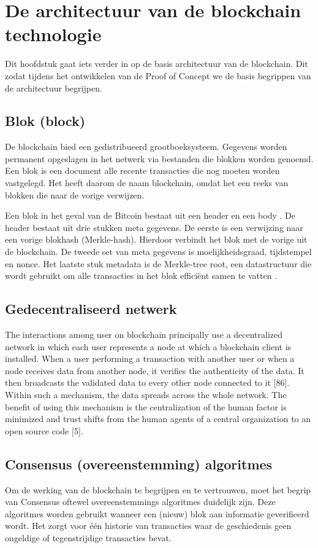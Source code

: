 \chapter{De architectuur van de blockchain technologie}
Dit hoofdstuk gaat iets verder in op de basis architectuur van de blockchain. Dit zodat tijdens het ontwikkelen van de Proof of Concept we de basis begrippen van de architectuur begrijpen.

\section{Blok (block)}
De blockchain bied een gedistribueerd grootboeksysteem. Gegevens worden permanent opgeslagen in het netwerk via bestanden die blokken worden genoemd. Een blok is een document alle recente transacties die nog moeten worden vastgelegd. Het heeft daarom de naam blockchain, omdat het een reeks van blokken die naar de vorige verwijzen\cite{blochchainTechSymmbioticDev}.\par

Een blok in het geval van de Bitcoin bestaat uit een header en een body \cite{blockchainIssuesAndChallenges}. De header bestaat uit drie stukken meta gegevens. De eerste is een verwijzing naar een vorige blokhash (Merkle-hash). Hierdoor verbindt het blok met de vorige uit de blockchain. De tweede set van meta gegevens is  moelijkheidsgraad, tijdstempel en nonce. Het laatste stuk metadata is de Merkle-tree root, een datastructuur die wordt gebruikt om alle transacties in het blok efficiënt samen te vatten \cite{masteringBitcoin}.

\section{Gedecentraliseerd netwerk}
The interactions among user on blockchain principally use a decentralized network in which each user represents a node at which a blockchain client is installed. When a user performing a transaction with another user or when a node receives data from another node, it verifies the authenticity of the data. It then broadcasts the validated data to every other node connected to it [86]. Within such a mechanism, the data spreads across the whole network. The benefit of using this mechanism is the centralization of the human factor is minimized and trust shifts from the human agents of a central organization to an open source code [5].
\newpage

\section{Consensus (overeenstemming) algoritmes}
Om de werking van de blockchain te begrijpen en te vertrouwen, moet het begrip van Consensus oftewel overeenstemmings algoritmes duidelijk zijn. Deze algoritmes worden gebruikt wanneer een (nieuw) blok aan informatie geverifieerd wordt. Het zorgt voor één historie van transacties waar de geschiedenis geen ongeldige of tegenstrijdige transacties bevat.\par

